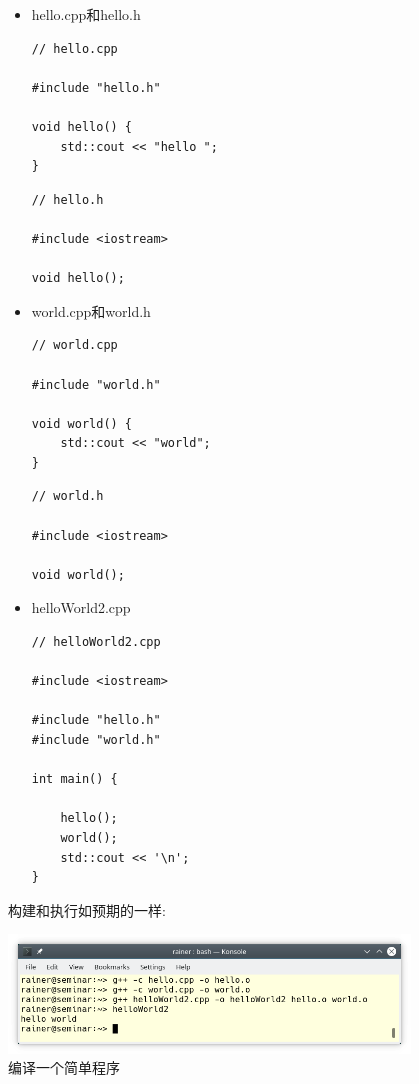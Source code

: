 \begin{itemize}
\item 
hello.cpp和hello.h

\begin{lstlisting}[style=styleCXX]
// hello.cpp

#include "hello.h"

void hello() {
	std::cout << "hello ";
}
\end{lstlisting}

\begin{lstlisting}[style=styleCXX]
// hello.h

#include <iostream>

void hello();
\end{lstlisting}

\item 
world.cpp和world.h

\begin{lstlisting}[style=styleCXX]
// world.cpp

#include "world.h"

void world() {
	std::cout << "world";
}
\end{lstlisting}

\begin{lstlisting}[style=styleCXX]
// world.h

#include <iostream>

void world();
\end{lstlisting}

\item 
helloWorld2.cpp

\begin{lstlisting}[style=styleCXX]
// helloWorld2.cpp

#include <iostream>

#include "hello.h"
#include "world.h"

int main() {
	
	hello();
	world();
	std::cout << '\n';
}
\end{lstlisting}


\end{itemize}

构建和执行如预期的一样:

\begin{center}
\includegraphics[width=0.8\textwidth]{content/3/chapter4/images/14.png}\\
编译一个简单程序
\end{center}

